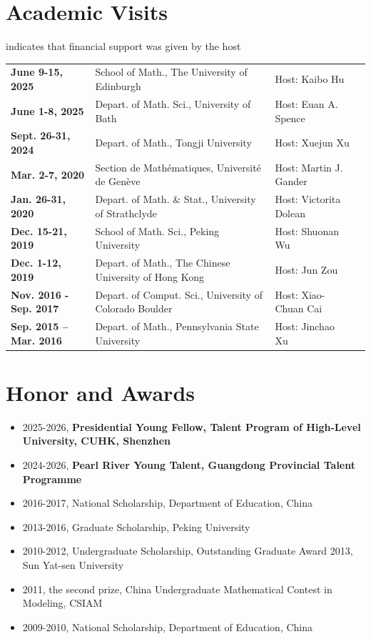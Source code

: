\documentclass[letterpaper]{article}
\begin{document}
\section*{Academic Visits}
\hfill {\bf*} indicates that financial support was given by the host
\noindent
\begin{tabularx}{\linewidth}{@{}>{\bfseries}l@{\hspace{.5em}}X@{}l@{\hspace{.0em}}X@{}}
{\bf *} June 9-15, 2025& School of Math., The University of Edinburgh &Host: Kaibo Hu\\
June 1-8, 2025& Depart. of Math. Sci., University of Bath &Host: Euan A. Spence\\
{\bf *} Sept. 26-31, 2024&    Depart.  of Math., Tongji University &Host: Xuejun Xu\\
{\bf *} Mar. 2-7, 2020&             Section de Mathématiques, Université de Genève & Host: Martin J. Gander\\
Jan. 26-31, 2020&             Depart.  of Math. \& Stat., University of Strathclyde & Host: Victorita Dolean\\
{\bf *} Dec. 15-21, 2019&		School of Math. Sci., Peking University & Host: Shuonan Wu\\
{\bf *} Dec. 1-12, 2019&		Depart. of Math., The Chinese University of Hong Kong  & Host:  Jun Zou \\
Nov. 2016 - Sep. 2017&		 Depart. of Comput. Sci., University of Colorado Boulder & Host:  Xiao-Chuan Cai\\
{\bf *} Sep. 2015 -- Mar. 2016&		 Depart. of Math., Pennsylvania State University & Host:  Jinchao Xu
\end{tabularx}

\section*{Honor and Awards}
\begin{itemize}[leftmargin=*]
\item 2025-2026, {\bf Presidential Young Fellow, Talent Program of High-Level University, CUHK, Shenzhen}
\item 2024-2026, {\bf Pearl River Young Talent, Guangdong Provincial  Talent Programme} 
\item 2016-2017, National Scholarship, Department of Education, China
\item 2013-2016, Graduate Scholarship, Peking University
\item 2010-2012,  Undergraduate Scholarship, Outstanding Graduate Award 2013, Sun Yat-sen University
\item 2011, the second prize, China Undergraduate Mathematical Contest in Modeling, CSIAM
\item 2009-2010, National Scholarship, Department of Education, China
\end{itemize}
\end{document}
